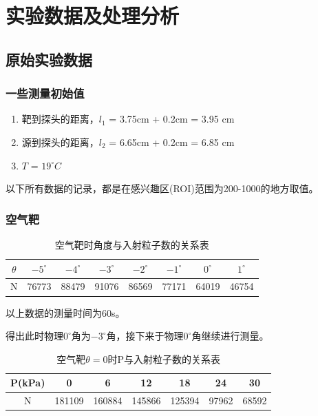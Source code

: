 \documentclass[a4paper,UTF8]{ctexart}
\begin{document}
\section{实验数据及处理分析}

\subsection{原始实验数据}

\subsubsection{一些测量初始值}

\begin{enumerate}
    \item 靶到探头的距离，$l_1$ = 3.75cm + 0.2cm = 3.95 cm
    \item 源到探头的距离，$l_2$ = 6.65cm + 0.2cm = 6.85 cm
    \item $T$ = $19 ^\circ C$ 
\end{enumerate}

以下所有数据的记录，都是在感兴趣区(ROI)范围为200-1000的地方取值。

\subsubsection{空气靶}

\begin{table}[H]
    \centering
    \begin{tabular}{|c|c|c|c|c|c|c|c|}
    \hline
        $\theta$ & $-5^{\circ}$ & $-4^{\circ}$ & $-3^{\circ}$ & $-2^{\circ}$ & $-1^{\circ}$ & $0^{\circ}$ & $1^{\circ}$ \\ \hline
        N & 76773 & 88479 & 91076 & 86569 & 77171 & 64019 & 46754 \\ \hline
    \end{tabular}
    \caption{空气靶时角度与入射粒子数的关系表}
\end{table}

以上数据的测量时间为60s。

得出此时物理$0^\circ$角为$-3^\circ$角，接下来于物理$0^\circ$角继续进行测量。

\begin{table}[H]
    \centering
    \begin{tabular}{|c|c|c|c|c|c|c|}
    \hline
        P(kPa) & 0 & 6 & 12 & 18 & 24 & 30 \\ \hline
        N & 181109 & 160884 & 145866 & 125394 & 97962 & 68592 \\ \hline
    \end{tabular}
    \caption{空气靶$\theta=0$时P与入射粒子数的关系表}
\end{table}
\end{document}
